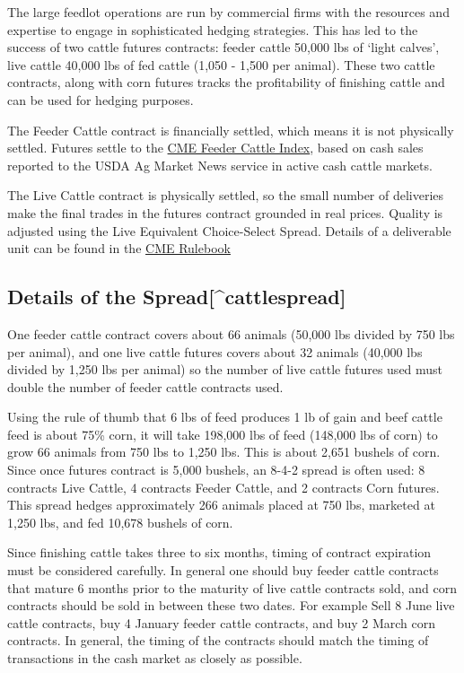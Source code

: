 \documentclass[
]{book}
\begin{document}
The large feedlot operations are run by commercial firms with the resources and expertise to engage in sophisticated hedging strategies. This has led to the success of two cattle futures contracts: feeder cattle 50,000 lbs of `light calves', live cattle 40,000 lbs of fed cattle (1,050 - 1,500 per animal). These two cattle contracts, along with corn futures tracks the profitability of finishing cattle and can be used for hedging purposes.

The Feeder Cattle contract is financially settled, which means it is not physically settled. Futures settle to the \href{http://www.cmegroup.com/market-data/reports/cash-settled-commodity-index-prices.html}{CME Feeder Cattle Index}, based on cash sales reported to the USDA Ag Market News service in active cash cattle markets.

The Live Cattle contract is physically settled, so the small number of deliveries make the final trades in the futures contract grounded in real prices. Quality is adjusted using the Live Equivalent Choice-Select Spread. Details of a deliverable unit can be found in the \href{http://www.cmegroup.com/rulebook/CME/II/100/101/101.pdf}{CME Rulebook}

\hypertarget{details-of-the-spreadcattlespread}{%
\subsection{Details of the Spread{[}\^{}cattlespread{]}}\label{details-of-the-spreadcattlespread}}

One feeder cattle contract covers about 66 animals (50,000 lbs divided by 750 lbs per animal), and one live cattle futures covers about 32 animals (40,000 lbs divided by 1,250 lbs per animal) so the number of live cattle futures used must double the number of feeder cattle contracts used.

Using the rule of thumb that 6 lbs of feed produces 1 lb of gain and beef cattle feed is about 75\% corn, it will take 198,000 lbs of feed (148,000 lbs of corn) to grow 66 animals from 750 lbs to 1,250 lbs. This is about 2,651 bushels of corn. Since once futures contract is 5,000 bushels, an 8-4-2 spread is often used: 8 contracts Live Cattle, 4 contracts Feeder Cattle, and 2 contracts Corn futures. This spread hedges approximately 266 animals placed at 750 lbs, marketed at 1,250 lbs, and fed 10,678 bushels of corn.

Since finishing cattle takes three to six months, timing of contract expiration must be considered carefully. In general one should buy feeder cattle contracts that mature 6 months prior to the maturity of live cattle contracts sold, and corn contracts should be sold in between these two dates. For example Sell 8 June live cattle contracts, buy 4 January feeder cattle contracts, and buy 2 March corn contracts. In general, the timing of the contracts should match the timing of transactions in the cash market as closely as possible.
\end{document}
